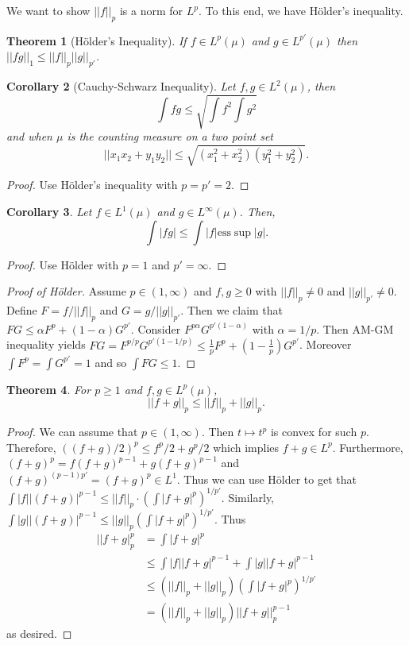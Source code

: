 \documentclass{article}
\newtheorem{theorem}{Theorem}[section]
\newtheorem{corollary}[theorem]{Corollary}
\theoremstyle{definition}
\begin{document}
We want to show $||f||_p$ is a norm for $L^p$. To this end, we have H\"older's inequality.

\begin{theorem}[H\"older's Inequality]
    If $f\in L^p(\mu)$ and $g\in L^{p'}(\mu)$ then $||fg||_1\leq ||f||_p||g||_{p'}$.
\end{theorem}

\begin{corollary}[Cauchy-Schwarz Inequality]
    Let $f,g\in L^2(\mu)$, then
    \[
        \int fg \leq \sqrt{\int f^2\int g^2}
    \]
    and when $\mu$ is the counting measure on a two point set
    \[
        ||x_1x_2+y_1y_2||\leq \sqrt{(x_1^2+x_2^2)(y_1^2+y_2^2)}.
    \]
\end{corollary}
\begin{proof}
    Use H\"older's inequality with $p=p'=2$.
\end{proof}

\begin{corollary}
    Let $f\in L^1(\mu)$ and $g\in L^\infty(\mu)$. Then,
    \[
        \int |fg| \leq \int |f|\text{ess}\sup |g|.
    \]
\end{corollary}
\begin{proof}
    Use H\"older with $p=1$ and $p'=\infty$.
\end{proof}

\begin{proof}[Proof of H\"older]
    Assume $p\in(1,\infty)$ and $f,g\geq 0$ with $||f||_p\neq 0$ and $||g||_{p'}\neq 0$. Define $F=f/||f||_p$ and $G=g/||g||_{p'}$.
    Then we claim that $FG\leq \alpha F^p+(1-\alpha) G^{p'}$. Consider $F^{p\alpha}G^{p'(1-\alpha)}$ with $\alpha=1/p$. Then
    AM-GM inequality yields $FG=F^{p/p}G^{p'(1-1/p)}\leq \frac{1}{p}F^p+(1-\frac{1}{p}) G^{p'}$.
    Moreover $\int F^p=\int G^{p'}=1$ and so $\int FG\leq 1$.
\end{proof}

\begin{theorem}
    For $p\geq 1$ and $f,g\in L^p(\mu)$,
    \[
        ||f+g||_p\leq ||f||_p+||g||_p.
    \]
\end{theorem}

\begin{proof}
    We can assume that $p\in(1,\infty)$. Then $t\mapsto t^p$ is convex for such $p$. Therefore, $((f+g)/2)^p\leq f^p/2+g^p/2$
    which implies $f+g\in L^p$. Furthermore, $(f+g)^p=f(f+g)^{p-1}+g(f+g)^{p-1}$ and $(f+g)^{(p-1)p'}=(f+g)^p\in L^1$. Thus we can
    use H\"older to get that $\int |f||(f+g)|^{p-1}\leq ||f||_p \cdot \left(\int|f+g|^p\right)^{1/p'}$. Similarly,
    $\int|g||(f+g)|^{p-1}\leq ||g||_p\left(\int |f+g|^p\right)^{1/p'}$. Thus 
    \begin{align*}
        ||f+g|_p^p&=\int |f+g|^p\\
        &\leq \int |f||f+g|^{p-1} + \int |g||f+g|^{p-1}\\
        &\leq (||f||_p+||g||_p)\left(\int |f+g|^p\right)^{1/p'}\\
        &=(||f||_p+||g||_p)||f+g||_p^{p-1}
    \end{align*}
    as desired.
\end{proof}
\end{document}
